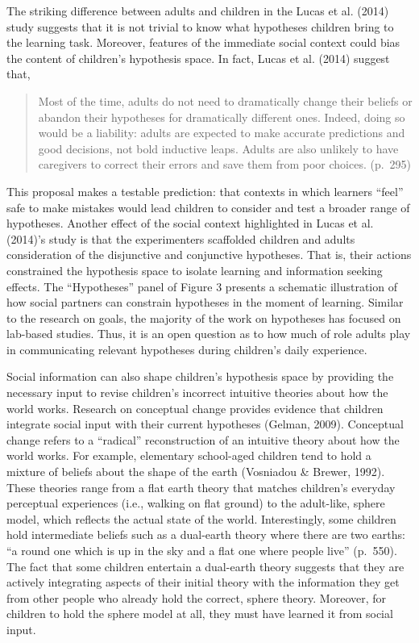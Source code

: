 \documentclass[english,floatsintext,man]{apa6}
\theoremstyle{definition}
\theoremstyle{definition}
\theoremstyle{definition}
\theoremstyle{remark}
\begin{document}
The striking difference between adults and children in the Lucas et al.
(2014) study suggests that it is not trivial to know what hypotheses
children bring to the learning task. Moreover, features of the immediate
social context could bias the content of children's hypothesis space. In
fact, Lucas et al. (2014) suggest that,

\begin{quote}
Most of the time, adults do not need to dramatically change their
beliefs or abandon their hypotheses for dramatically different ones.
Indeed, doing so would be a liability: adults are expected to make
accurate predictions and good decisions, not bold inductive leaps.
Adults are also unlikely to have caregivers to correct their errors and
save them from poor choices. (p.~295)
\end{quote}

\noindent
This proposal makes a testable prediction: that contexts in which
learners \enquote{feel} safe to make mistakes would lead children to
consider and test a broader range of hypotheses. Another effect of the
social context highlighted in Lucas et al. (2014)'s study is that the
experimenters scaffolded children and adults consideration of the
disjunctive and conjunctive hypotheses. That is, their actions
constrained the hypothesis space to isolate learning and information
seeking effects. The \enquote{Hypotheses} panel of Figure 3 presents a
schematic illustration of how social partners can constrain hypotheses
in the moment of learning. Similar to the research on goals, the
majority of the work on hypotheses has focused on lab-based studies.
Thus, it is an open question as to how much of role adults play in
communicating relevant hypotheses during children's daily experience.

Social information can also shape children's hypothesis space by
providing the necessary input to revise children's incorrect intuitive
theories about how the world works. Research on conceptual change
provides evidence that children integrate social input with their
current hypotheses (Gelman, 2009). Conceptual change refers to a
\enquote{radical} reconstruction of an intuitive theory about how the
world works. For example, elementary school-aged children tend to hold a
mixture of beliefs about the shape of the earth (Vosniadou \& Brewer,
1992). These theories range from a flat earth theory that matches
children's everyday perceptual experiences (i.e., walking on flat
ground) to the adult-like, sphere model, which reflects the actual state
of the world. Interestingly, some children hold intermediate beliefs
such as a dual-earth theory where there are two earths: \enquote{a round
one which is up in the sky and a flat one where people live} (p.~550).
The fact that some children entertain a dual-earth theory suggests that
they are actively integrating aspects of their initial theory with the
information they get from other people who already hold the correct,
sphere theory. Moreover, for children to hold the sphere model at all,
they must have learned it from social input.
\end{document}
